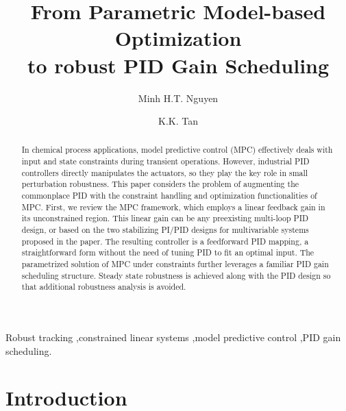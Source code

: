 \documentclass[5p,authoryear,times]{elsarticle}
\begin{document}
\title{From Parametric Model-based Optimization\\to robust PID Gain Scheduling}
\author[rvt]{Minh H.T. Nguyen }

\author[rvt]{K.K. Tan}

\address[rvt]{National University of Singapore, Department of Electrical and Computer Engineering,\\3 Engineering Drive 3, Singapore 117576}

\begin{abstract}
In chemical process applications, model predictive control (MPC) effectively deals with input and state constraints during transient operations. However, industrial PID controllers directly manipulates the actuators, so they play the key role in small perturbation robustness. This paper considers the problem of augmenting the commonplace PID with the constraint handling and optimization functionalities of MPC. First, we review the MPC framework, which employs a linear feedback gain in its unconstrained region. This linear gain can be any preexisting multi-loop PID design, or based on the two stabilizing PI/PID designs for multivariable systems proposed in the paper. The resulting controller is a feedforward PID mapping, a straightforward form without the need of tuning PID to fit an optimal input. The parametrized solution of MPC under constraints further leverages a familiar PID gain scheduling structure. Steady state robustness is achieved along with the PID design so that additional robustness analysis is avoided.


\end{abstract}

\begin{keyword}
Robust tracking \sep constrained linear systems \sep model predictive control \sep PID gain scheduling.
\end{keyword}
\maketitle

\section{Introduction}\label{intro}
\end{document}
